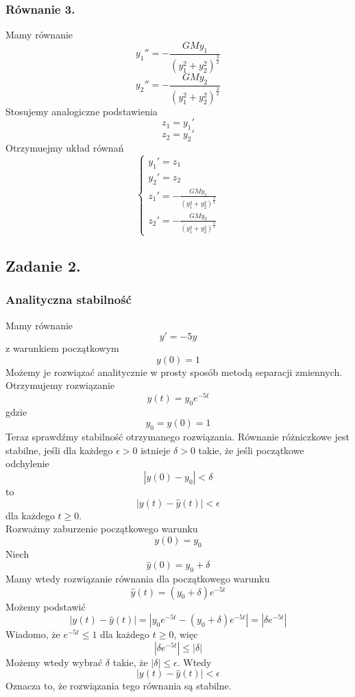 \documentclass[11pt, leqno]{scrartcl}
\begin{document}
    \subsubsection{Równanie 3.}
    Mamy równanie
    \[
        y_1''=-\frac{GMy_1}{(y_1^2+y_2^2)^{\frac{3}{2}}}
    \]
    \[
        y_2''=-\frac{GMy_2}{(y_1^2+y_2^2)^{\frac{3}{2}}}
    \]
    Stosujemy analogiczne podstawienia
    \[
        z_1=y_1'
    \]
    \[
        z_2=y_2'
    \]
    Otrzymuejmy układ równań
    \[
        \begin{cases}
            y_1'=z_1 \\
            y_2'=z_2 \\
            z_1'=-\frac{GMy_1}{(y_1^2+y_2^2)^{\frac{3}{2}}} \\
            z_2'=-\frac{GMy_2}{(y_1^2+y_2^2)^{\frac{3}{2}}}
        \end{cases}
    \]

    \subsection{Zadanie 2.}
    \subsubsection{Analityczna stabilność}
    Mamy równanie
    \[
        y'=-5y
    \]
    z warunkiem początkowym
    \[
        y(0)=1
    \]
    Możemy je rozwiązać analitycznie w prosty sposób metodą
    separacji zmiennych. Otrzymujemy rozwiązanie
    \[
        y(t)=y_0e^{-5t}
    \]
    gdzie
    \[
        y_0=y(0)=1
    \]
    Teraz sprawdźmy stabilność otrzymanego rozwiązania.
    Równanie różniczkowe jest stabilne, jeśli dla każdego
    $\epsilon > 0$ istnieje $\delta > 0$ takie, że jeśli
    początkowe odchylenie
    \[
        |y(0)-y_0|<\delta
    \]
    to
    \[
        |y(t)-\hat{y}(t)|<\epsilon
    \]
    dla każdego $t \geq 0$. \\ 
    Rozważmy zaburzenie początkowego warunku
    \[
        y(0)=y_0
    \]
    Niech
    \[
        \hat{y}(0)=y_0+\delta
    \]
    Mamy wtedy rozwiązanie równania dla początkowego warunku
    \[
        \hat{y}(t)=(y_0+\delta)e^{-5t}
    \]
    Możemy podstawić
    \[
        |y(t)-\hat{y}(t)|=|y_0e^{-5t}-(y_0+\delta)e^{-5t}|=
            |\delta e^{-5t}|
    \]
    Wiadomo, że $e^{-5t} \leq 1$ dla każdego $t \geq 0$, więc
    \[
        |\delta e^{-5t}| \leq |\delta|
    \]
    Możemy wtedy wybrać $\delta$ takie, że
    $|\delta | \leq \epsilon $. Wtedy
    \[
        |y(t)-\hat{y}(t)| < \epsilon
    \]
    Oznacza to, że rozwiązania tego równania są stabilne.
\end{document}
